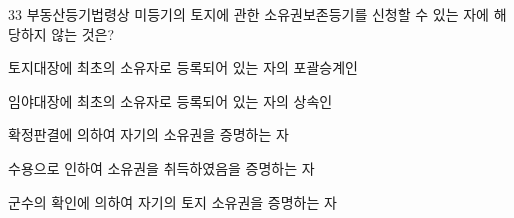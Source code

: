 \begin{question}{33}
부동산등기법령상 미등기의 토지에 관한 소유권보존등기를 신청할 수 있는 자에 해당하지 않는 것은?
\begin{choices}
  \item 토지대장에 최초의 소유자로 등록되어 있는 자의 포괄승계인
  \item 임야대장에 최초의 소유자로 등록되어 있는 자의 상속인
  \item 확정판결에 의하여 자기의 소유권을 증명하는 자
  \item 수용으로 인하여 소유권을 취득하였음을 증명하는 자
  \item 군수의 확인에 의하여 자기의 토지 소유권을 증명하는 자
\end{choices}
\end{question}
